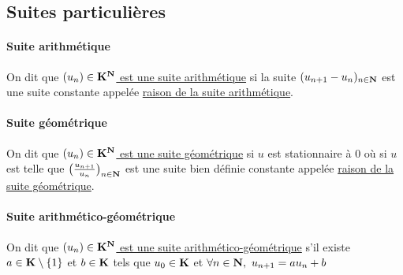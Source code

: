 	\subsection{Suites particulières}
		\traitd \paragraph{Suite arithmétique}
			On dit que \uline{$(u_n)\in{\mathbf{K}}^{\mathbf{N}}$ est une suite arithmétique} si la suite $(u_{n+1}-u_n)_{n\in{\mathbf{N}}}$ est une suite constante appelée \uline{raison de la suite arithmétique}. \trait
		 \\ 
		\traitd \paragraph{Suite géométrique}
			On dit que \uline{$(u_n)\in{\mathbf{K}}^{\mathbf{N}}$ est une suite géométrique} si $u$ est stationnaire à $0$ où si $u$ est telle que $\big( \frac{u_{n+1}}{u_n}\big)_{n\in{\mathbf{N}}}$ est une suite bien définie constante appelée \uline{raison de la suite géométrique}. \trait
		 \\ \traitd
		\paragraph{Suite arithmético-géométrique}
			On dit que \uline{$(u_n)\in{\mathbf{K}}^{\mathbf{N}}$ est une suite arithmético-géométrique} s'il existe $a\in{\mathbf{K}}\setminus\{1\}$ et $b\in{\mathbf{K}}$ tels que $u_0\in{\mathbf{K}}$ et $\forall n\in{\mathbf{N}} ,~u_{n+1} = au_n + b$ \trait
		 \newpage \traitd
